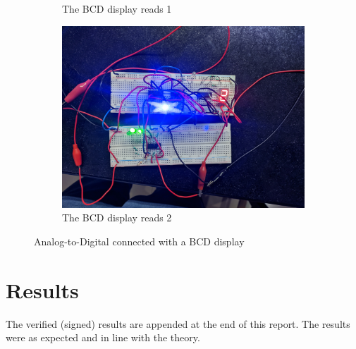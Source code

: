 \documentclass[%
 reprint,
nofootinbib,
 amsmath,amssymb,
 aps,
floatfix,
]{revtex4-2}
\begin{document}
\begin{figure}
\begin{subfigure}[b]{0.3\textwidth}
            \caption{The BCD display reads 1}
            \label{fig:three sin x}
        \end{subfigure}
        \hfill
        \begin{subfigure}[b]{0.3\textwidth}
            \centering
            \includegraphics[width=\textwidth]{Figures/7.jpg}
            \caption{The BCD display reads 2}
            \label{fig:three sin x}
        \end{subfigure}
        \caption{Analog-to-Digital connected with a BCD display}
    \end{figure}
    
\section{Results}
    The verified (signed) results are appended at the end of this report. The results were as expected and in line with the theory.
    
\end{document}
